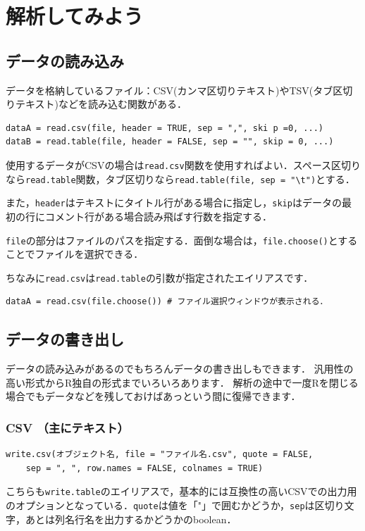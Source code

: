 \section{解析してみよう}
\subsection{データの読み込み}
データを格納しているファイル：CSV(カンマ区切りテキスト)やTSV(タブ区切りテキスト)などを読み込む関数がある．
\begin{screen}
\begin{verbatim}
dataA = read.csv(file, header = TRUE, sep = ",", ski p =0, ...) 
dataB = read.table(file, header = FALSE, sep = "", skip = 0, ...) 
\end{verbatim}
\end{screen}

使用するデータがCSVの場合は{\tt read.csv}関数を使用すればよい．スペース区切りなら{\tt read.table}関数，タブ区切りなら{\tt read.table(file, sep = "\verb+\+t")}とする．

また，{\tt header}はテキストにタイトル行がある場合に指定し，{\tt skip}はデータの最初の行にコメント行がある場合読み飛ばす行数を指定する．

{\tt file}の部分はファイルのパスを指定する．面倒な場合は，{\tt file.choose()}とすることでファイルを選択できる．

ちなみに\verb+read.csv+は\verb+read.table+の引数が指定されたエイリアスです．
\begin{screen}
\begin{verbatim}
dataA = read.csv(file.choose()) # ファイル選択ウィンドウが表示される．
\end{verbatim}
\end{screen}
\subsection{データの書き出し}
データの読み込みがあるのでもちろんデータの書き出しもできます．
汎用性の高い形式からR独自の形式までいろいろあります．
解析の途中で一度Rを閉じる場合でもデータなどを残しておけばあっという間に復帰できます．
\subsubsection{CSV （主にテキスト）}
\begin{screen}
\begin{verbatim}
write.csv(オブジェクト名, file = "ファイル名.csv", quote = FALSE,
    sep = ", ", row.names = FALSE, colnames = TRUE)
\end{verbatim}
\end{screen}
こちらも\verb+write.table+のエイリアスで，基本的には互換性の高いCSVでの出力用のオプションとなっている．\verb+quote+は値を「"」で囲むかどうか，\verb+sep+は区切り文字，あとは列名行名を出力するかどうかのboolean．

